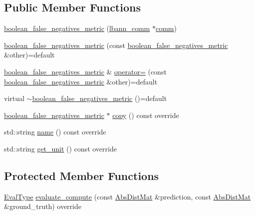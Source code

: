 \subsection*{Public Member Functions}
\begin{DoxyCompactItemize}
\item 
\hyperlink{classlbann_1_1boolean__false__negatives__metric_abb7220421c393713e5a79a3da3b4b79c}{boolean\+\_\+false\+\_\+negatives\+\_\+metric} (\hyperlink{classlbann_1_1lbann__comm}{lbann\+\_\+comm} $\ast$\hyperlink{file__io_8cpp_ab048c6f9fcbcfaa57ce68b00263dbebe}{comm})
\item 
\hyperlink{classlbann_1_1boolean__false__negatives__metric_ad064e2cf0b555cb1e4d2fb18874e8c77}{boolean\+\_\+false\+\_\+negatives\+\_\+metric} (const \hyperlink{classlbann_1_1boolean__false__negatives__metric}{boolean\+\_\+false\+\_\+negatives\+\_\+metric} \&other)=default
\item 
\hyperlink{classlbann_1_1boolean__false__negatives__metric}{boolean\+\_\+false\+\_\+negatives\+\_\+metric} \& \hyperlink{classlbann_1_1boolean__false__negatives__metric_a3182852b817e1e4edc5593220ab84e58}{operator=} (const \hyperlink{classlbann_1_1boolean__false__negatives__metric}{boolean\+\_\+false\+\_\+negatives\+\_\+metric} \&other)=default
\item 
virtual \hyperlink{classlbann_1_1boolean__false__negatives__metric_a85ce390a99cba31c006e148de4a9354c}{$\sim$boolean\+\_\+false\+\_\+negatives\+\_\+metric} ()=default
\item 
\hyperlink{classlbann_1_1boolean__false__negatives__metric}{boolean\+\_\+false\+\_\+negatives\+\_\+metric} $\ast$ \hyperlink{classlbann_1_1boolean__false__negatives__metric_abd0e7a6040232d5b6d8b10e79a3208c1}{copy} () const override
\item 
std\+::string \hyperlink{classlbann_1_1boolean__false__negatives__metric_a7e7f60e7babfbaad2dce5def175a8fbd}{name} () const override
\item 
std\+::string \hyperlink{classlbann_1_1boolean__false__negatives__metric_abe2bdb0c15ff481caa234e13fe7df2b9}{get\+\_\+unit} () const override
\end{DoxyCompactItemize}
\subsection*{Protected Member Functions}
\begin{DoxyCompactItemize}
\item 
\hyperlink{base_8hpp_a3266f5ac18504bbadea983c109566867}{Eval\+Type} \hyperlink{classlbann_1_1boolean__false__negatives__metric_a598dfc1ee40c4e11f001cbf8899e0e0a}{evaluate\+\_\+compute} (const \hyperlink{base_8hpp_a9a697a504ae84010e7439ffec862b470}{Abs\+Dist\+Mat} \&prediction, const \hyperlink{base_8hpp_a9a697a504ae84010e7439ffec862b470}{Abs\+Dist\+Mat} \&ground\+\_\+truth) override
\end{DoxyCompactItemize}


